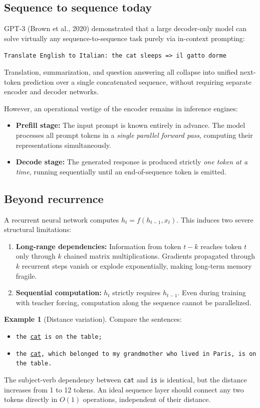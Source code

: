 \documentclass[11pt,a4paper]{article}
\newcommand{\slides}[1]{\par\nopagebreak\noindent{\normalfont\small\emph{(slides #1)}}\par\nopagebreak\vspace{2pt}}
\theoremstyle{definition}
\newtheorem{example}[definition]{Example}
\theoremstyle{plain}
\begin{document}
\subsection{Sequence to sequence today}\slides{21 / 84}
GPT-3 (Brown et al., 2020) demonstrated that a large decoder-only model can solve virtually any sequence-to-sequence task purely via in-context prompting:
\begin{center}
\texttt{Translate English to Italian: the cat sleeps => il gatto dorme}
\end{center}
Translation, summarization, and question answering all collapse into unified next-token prediction over a single concatenated sequence, without requiring separate encoder and decoder networks.

However, an operational vestige of the encoder remains in inference engines:
\begin{itemize}[nosep]
\item \textbf{Prefill stage:} The input prompt is known entirely in advance. The model processes all prompt tokens in a \emph{single parallel forward pass}, computing their representations simultaneously.
\item \textbf{Decode stage:} The generated response is produced strictly \emph{one token at a time}, running sequentially until an end-of-sequence token is emitted.
\end{itemize}

\subsection{Beyond recurrence}\slides{22 / 84}
A recurrent neural network computes $h_t = f(h_{t-1}, x_t)$. This induces two severe structural limitations:
\begin{enumerate}
\item \textbf{Long-range dependencies:} Information from token $t-k$ reaches token $t$ only through $k$ chained matrix multiplications. Gradients propagated through $k$ recurrent steps vanish or explode exponentially, making long-term memory fragile.
\item \textbf{Sequential computation:} $h_t$ strictly requires $h_{t-1}$. Even during training with teacher forcing, computation along the sequence cannot be parallelized.
\end{enumerate}

\begin{example}[Distance variation]
Compare the sentences:
\begin{itemize}[nosep]
\item \texttt{the \underline{cat} is on the table;}
\item \texttt{the \underline{cat}, which belonged to my grandmother who lived in Paris, is on the table.}
\end{itemize}
The subject-verb dependency between \texttt{cat} and \texttt{is} is identical, but the distance increases from 1 to 12 tokens. An ideal sequence layer should connect any two tokens directly in $O(1)$ operations, independent of their distance.
\end{example}
\end{document}
